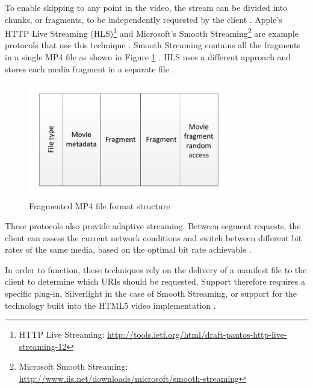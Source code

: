 \documentclass[journal]{IEEEtran}
\begin{document}
To enable skipping to any point in the video, the stream can be divided into chunks, or fragments, to be independently requested by the client \cite{article:areWeInTheMiddleOfAVideoStreamingRevolution}. Apple's HTTP Live Streaming (HLS)\footnote{HTTP Live Streaming: \url{http://tools.ietf.org/html/draft-pantos-http-live-streaming-12}} and Microsoft's Smooth Streaming\footnote{Microsoft Smooth Streaming: \url{http://www.iis.net/downloads/microsoft/smooth-streaming}} are example protocols that use this technique \cite{article:watchingVideoOverTheWeb}. Smooth Streaming contains all the fragments in a single MP4 file as shown in Figure \ref{fig:mp4Structure} \cite{article:watchingVideoOverTheWeb}. HLS uses a different approach and stores each media fragment in a separate file \cite{article:watchingVideoOverTheWeb}.

\begin{figure}[!t]
\centering
\includegraphics[width=3.5in]{smooth-streaming}
\caption{Fragmented MP4 file format structure \cite{article:watchingVideoOverTheWeb}}
\label{fig:mp4Structure}
\end{figure} 

These protocols also provide adaptive streaming. Between segment requests, the client can assess the current network conditions and switch between different bit rates of the same media, based on the optimal bit rate achievable \cite{article:areWeInTheMiddleOfAVideoStreamingRevolution}.

In order to function, these techniques rely on the delivery of a manifest file to the client to determine which URIs should be requested. %
Support therefore requires a specific plug-in, Silverlight in the case of Smooth Streaming, or support for the technology built into the HTML5 video implementation \cite{inproceedings:aSeamlessIntegrationOfAdaptiveHTTPStreaming}. %
\end{document}

